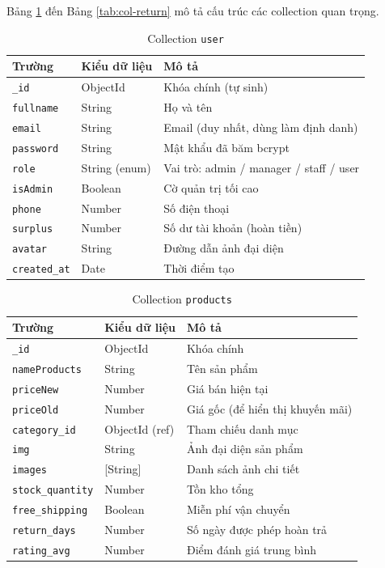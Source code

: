 \documentclass[../DoAn.tex]{subfiles}
\begin{document}
Bảng \ref{tab:col-user} đến Bảng \ref{tab:col-return} mô tả cấu trúc các
collection quan trọng.

\begin{table}[H]
\centering
\caption{Collection \texttt{user}}
\label{tab:col-user}
\scriptsize
\begin{tabular}{|p{3.5cm}|p{3cm}|p{6cm}|}
\hline
\textbf{Trường} & \textbf{Kiểu dữ liệu} & \textbf{Mô tả} \\
\hline
\texttt{\_id} & ObjectId & Khóa chính (tự sinh) \\
\hline
\texttt{fullname} & String & Họ và tên \\
\hline
\texttt{email} & String & Email (duy nhất, dùng làm định danh) \\
\hline
\texttt{password} & String & Mật khẩu đã băm bcrypt \\
\hline
\texttt{role} & String (enum) & Vai trò: admin / manager / staff / user \\
\hline
\texttt{isAdmin} & Boolean & Cờ quản trị tối cao \\
\hline
\texttt{phone} & Number & Số điện thoại \\
\hline
\texttt{surplus} & Number & Số dư tài khoản (hoàn tiền) \\
\hline
\texttt{avatar} & String & Đường dẫn ảnh đại diện \\
\hline
\texttt{created\_at} & Date & Thời điểm tạo \\
\hline
\end{tabular}
\end{table}

\begin{table}[H]
\centering
\caption{Collection \texttt{products}}
\label{tab:col-products}
\scriptsize
\begin{tabular}{|p{3.5cm}|p{3cm}|p{6cm}|}
\hline
\textbf{Trường} & \textbf{Kiểu dữ liệu} & \textbf{Mô tả} \\
\hline
\texttt{\_id} & ObjectId & Khóa chính \\
\hline
\texttt{nameProducts} & String & Tên sản phẩm \\
\hline
\texttt{priceNew} & Number & Giá bán hiện tại \\
\hline
\texttt{priceOld} & Number & Giá gốc (để hiển thị khuyến mãi) \\
\hline
\texttt{category\_id} & ObjectId (ref) & Tham chiếu danh mục \\
\hline
\texttt{img} & String & Ảnh đại diện sản phẩm \\
\hline
\texttt{images} & [String] & Danh sách ảnh chi tiết \\
\hline
\texttt{stock\_quantity} & Number & Tồn kho tổng \\
\hline
\texttt{free\_shipping} & Boolean & Miễn phí vận chuyển \\
\hline
\texttt{return\_days} & Number & Số ngày được phép hoàn trả \\
\hline
\texttt{rating\_avg} & Number & Điểm đánh giá trung bình \\
\hline
\end{tabular}
\end{table}
\end{document}
